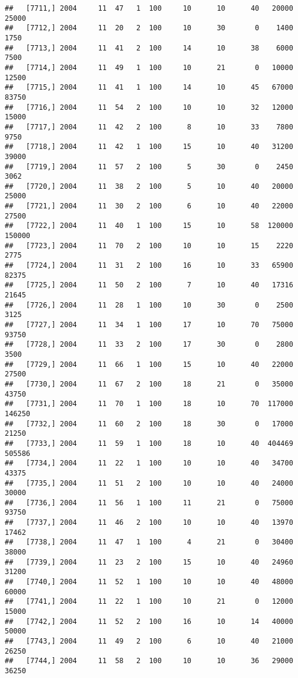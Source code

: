\documentclass{article}\usepackage[]{graphicx}\usepackage[]{color}
\makeatletter
\newenvironment{kframe}{%
 \def\at@end@of@kframe{}%
 \ifinner\ifhmode%
  \def\at@end@of@kframe{\end{minipage}}%
  \begin{minipage}{\columnwidth}%
 \fi\fi%
 \def\FrameCommand##1{\hskip\@totalleftmargin \hskip-\fboxsep
 \colorbox{shadecolor}{##1}\hskip-\fboxsep
     \hskip-\linewidth \hskip-\@totalleftmargin \hskip\columnwidth}%
 \MakeFramed {\advance\hsize-\width
   \@totalleftmargin\z@ \linewidth\hsize
   \@setminipage}}%
 {\par\unskip\endMakeFramed%
 \at@end@of@kframe}
\newenvironment{knitrout}{}{} %
\makeatother
\begin{document}
\begin{knitrout}
\begin{kframe}
\begin{verbatim}
##   [7711,] 2004     11  47   1  100     10      10      40   20000   25000
##   [7712,] 2004     11  20   2  100     10      30       0    1400    1750
##   [7713,] 2004     11  41   2  100     14      10      38    6000    7500
##   [7714,] 2004     11  49   1  100     10      21       0   10000   12500
##   [7715,] 2004     11  41   1  100     14      10      45   67000   83750
##   [7716,] 2004     11  54   2  100     10      10      32   12000   15000
##   [7717,] 2004     11  42   2  100      8      10      33    7800    9750
##   [7718,] 2004     11  42   1  100     15      10      40   31200   39000
##   [7719,] 2004     11  57   2  100      5      30       0    2450    3062
##   [7720,] 2004     11  38   2  100      5      10      40   20000   25000
##   [7721,] 2004     11  30   2  100      6      10      40   22000   27500
##   [7722,] 2004     11  40   1  100     15      10      58  120000  150000
##   [7723,] 2004     11  70   2  100     10      10      15    2220    2775
##   [7724,] 2004     11  31   2  100     16      10      33   65900   82375
##   [7725,] 2004     11  50   2  100      7      10      40   17316   21645
##   [7726,] 2004     11  28   1  100     10      30       0    2500    3125
##   [7727,] 2004     11  34   1  100     17      10      70   75000   93750
##   [7728,] 2004     11  33   2  100     17      30       0    2800    3500
##   [7729,] 2004     11  66   1  100     15      10      40   22000   27500
##   [7730,] 2004     11  67   2  100     18      21       0   35000   43750
##   [7731,] 2004     11  70   1  100     18      10      70  117000  146250
##   [7732,] 2004     11  60   2  100     18      30       0   17000   21250
##   [7733,] 2004     11  59   1  100     18      10      40  404469  505586
##   [7734,] 2004     11  22   1  100     10      10      40   34700   43375
##   [7735,] 2004     11  51   2  100     10      10      40   24000   30000
##   [7736,] 2004     11  56   1  100     11      21       0   75000   93750
##   [7737,] 2004     11  46   2  100     10      10      40   13970   17462
##   [7738,] 2004     11  47   1  100      4      21       0   30400   38000
##   [7739,] 2004     11  23   2  100     15      10      40   24960   31200
##   [7740,] 2004     11  52   1  100     10      10      40   48000   60000
##   [7741,] 2004     11  22   1  100     10      21       0   12000   15000
##   [7742,] 2004     11  52   2  100     16      10      14   40000   50000
##   [7743,] 2004     11  49   2  100      6      10      40   21000   26250
##   [7744,] 2004     11  58   2  100     10      10      36   29000   36250

\end{verbatim}
\end{kframe}
\end{knitrout}
\end{document}
